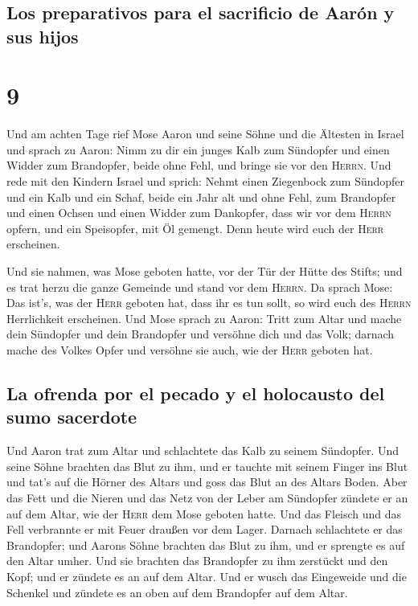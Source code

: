\hypertarget{los-preparativos-para-el-sacrificio-de-aaruxf3n-y-sus-hijos}{%
\subsection{Los preparativos para el sacrificio de Aarón y sus
hijos}\label{los-preparativos-para-el-sacrificio-de-aaruxf3n-y-sus-hijos}}

\hypertarget{section-8}{%
\section{9}\label{section-8}}

 Und am achten Tage rief Mose Aaron und seine Söhne und
die Ältesten in Israel  und sprach zu Aaron: Nimm zu dir
ein junges Kalb zum Sündopfer und einen Widder zum Brandopfer, beide
ohne Fehl, und bringe sie vor den \textsc{Herrn}.  Und
rede mit den Kindern Israel und sprich: Nehmt einen Ziegenbock zum
Sündopfer und ein Kalb und ein Schaf, beide ein Jahr alt und ohne Fehl,
zum Brandopfer  und einen Ochsen und einen Widder zum
Dankopfer, dass wir vor dem \textsc{Herrn} opfern, und ein Speisopfer,
mit Öl gemengt. Denn heute wird euch der \textsc{Herr} erscheinen.

 Und sie nahmen, was Mose geboten hatte, vor der Tür der
Hütte des Stifts; und es trat herzu die ganze Gemeinde und stand vor dem
\textsc{Herrn}.  Da sprach Mose: Das ist's, was der
\textsc{Herr} geboten hat, dass ihr es tun sollt, so wird euch des
\textsc{Herrn} Herrlichkeit erscheinen.  Und Mose sprach
zu Aaron: Tritt zum Altar und mache dein Sündopfer und dein Brandopfer
und versöhne dich und das Volk; darnach mache des Volkes Opfer und
versöhne sie auch, wie der \textsc{Herr} geboten hat.

\hypertarget{la-ofrenda-por-el-pecado-y-el-holocausto-del-sumo-sacerdote}{%
\subsection{La ofrenda por el pecado y el holocausto del sumo
sacerdote}\label{la-ofrenda-por-el-pecado-y-el-holocausto-del-sumo-sacerdote}}

 Und Aaron trat zum Altar und schlachtete das Kalb zu
seinem Sündopfer.  Und seine Söhne brachten das Blut zu
ihm, und er tauchte mit seinem Finger ins Blut und tat's auf die Hörner
des Altars und goss das Blut an des Altars Boden.  Aber
das Fett und die Nieren und das Netz von der Leber am Sündopfer zündete
er an auf dem Altar, wie der \textsc{Herr} dem Mose geboten hatte.
 Und das Fleisch und das Fell verbrannte er mit Feuer
draußen vor dem Lager.  Darnach schlachtete er das
Brandopfer; und Aarons Söhne brachten das Blut zu ihm, und er sprengte
es auf den Altar umher.  Und sie brachten das Brandopfer
zu ihm zerstückt und den Kopf; und er zündete es an auf dem Altar.
 Und er wusch das Eingeweide und die Schenkel und zündete
es an oben auf dem Brandopfer auf dem Altar.

